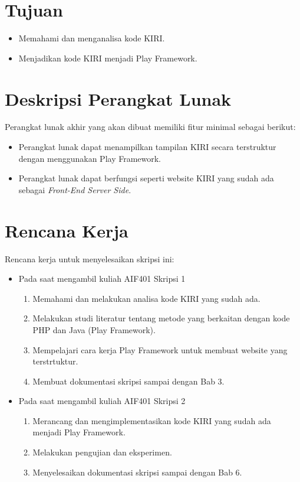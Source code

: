 \documentclass[a4paper,twoside]{article}
\begin{document}
\section{Tujuan}
\begin{itemize}
	\item Memahami dan menganalisa kode KIRI.
	\item Menjadikan kode KIRI menjadi Play Framework.
\end{itemize}

\section{Deskripsi Perangkat Lunak}
Perangkat lunak akhir yang akan dibuat memiliki fitur minimal sebagai berikut:
\begin{itemize}
	\item Perangkat lunak dapat menampilkan tampilan KIRI secara terstruktur dengan menggunakan Play Framework.
	\item Perangkat lunak dapat berfungsi seperti website KIRI yang sudah ada sebagai \textit{Front-End Server Side}.
\end{itemize}

\section{Rencana Kerja}

Rencana kerja untuk menyelesaikan skripsi ini:
\begin{itemize}
	\item Pada saat mengambil kuliah AIF401 Skripsi 1
	\begin{enumerate}
		\item Memahami dan melakukan analisa kode KIRI yang sudah ada.
		\item Melakukan studi literatur tentang metode yang berkaitan dengan kode PHP dan Java (Play Framework).
		\item Mempelajari cara kerja Play Framework untuk membuat website yang terstrtuktur.
		\item Membuat dokumentasi skripsi sampai dengan Bab 3.
	\end{enumerate}
	\item Pada saat mengambil kuliah AIF401 Skripsi 2
	\begin{enumerate}
		\item Merancang dan mengimplementasikan kode KIRI yang sudah ada menjadi Play Framework.
		\item Melakukan pengujian dan eksperimen.
		\item Menyelesaikan dokumentasi skripsi sampai dengan Bab 6.
	\end{enumerate}
\end{itemize}
\end{document}

